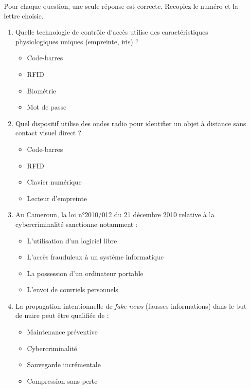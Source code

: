\documentclass[11pt]{article}
\begin{document}
\begin{exercice}
Pour chaque question, une seule réponse est correcte. Recopiez le numéro et la lettre choisie.
\begin{enumerate}
    \item Quelle technologie de contrôle d'accès utilise des caractéristiques physiologiques uniques (empreinte, iris) ?
    \begin{itemize}
        \item[A] Code-barres \item[B] RFID \item[C] Biométrie \item[D] Mot de passe
    \end{itemize}
    \item Quel dispositif utilise des ondes radio pour identifier un objet à distance sans contact visuel direct ?
    \begin{itemize}
        \item[A] Code-barres \item[B] RFID \item[C] Clavier numérique \item[D] Lecteur d'empreinte
    \end{itemize}
    \item Au Cameroun, la loi n°2010/012 du 21 décembre 2010 relative à la cybercriminalité sanctionne notamment :
    \begin{itemize}
        \item[A] L'utilisation d'un logiciel libre \item[B] L'accès frauduleux à un système informatique
        \item[C] La possession d'un ordinateur portable \item[D] L'envoi de courriels personnels
    \end{itemize}
    \item La propagation intentionnelle de \textit{fake news} (fausses informations) dans le but de nuire peut être qualifiée de :
    \begin{itemize}
        \item[A] Maintenance préventive \item[B] Cybercriminalité \item[C] Sauvegarde incrémentale \item[D] Compression sans perte
    \end{itemize}
\end{enumerate}
\end{exercice}
\end{document}
